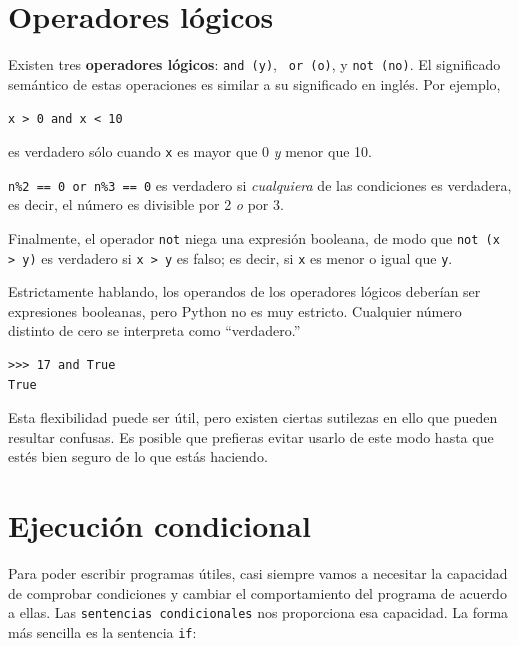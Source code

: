 

\section {Operadores lógicos}

Existen tres {\bf operadores lógicos}: {\tt and (y)}, {\tt
or (o)}, y {\tt not (no)}. El significado semántico de estas operaciones
es similar a su significado en inglés. Por ejemplo, 

{\tt x > 0 and x < 10} 

es verdadero sólo cuando {\tt x} es mayor que 0
\emph{y} menor que 10.


{\tt n\%2 == 0 or n\%3 == 0} es verdadero si \emph{cualquiera} de las condiciones
es verdadera, es decir, el número es divisible por 2 \emph{o} por 3.

Finalmente, el operador {\tt not} niega una expresión
booleana, de modo que {\tt not (x > y)} es verdadero si {\tt x > y} es falso;
es decir, si {\tt x} es menor o igual que {\tt y}.

Estrictamente hablando, los operandos de los operadores lógicos deberían ser
expresiones booleanas, pero Python no es muy estricto.
Cualquier número distinto de cero se interpreta como ``verdadero.''

\beforeverb
\begin{verbatim}
>>> 17 and True
True
\end{verbatim}
\afterverb
%
Esta flexibilidad puede ser útil, pero existen ciertas sutilezas en
ello que pueden resultar confusas. Es posible que prefieras evitar usarlo de este modo
hasta que estés bien seguro de lo que estás haciendo.

\section{Ejecución condicional}
\label{conditional execution}


Para poder escribir programas útiles, casi siempre vamos a necesitar
la capacidad de comprobar condiciones y cambiar el comportamiento del programa
de acuerdo a ellas. Las {\tt sentencias condicionales} nos proporciona esa capacidad.
La forma más sencilla es la sentencia {\tt if}:

